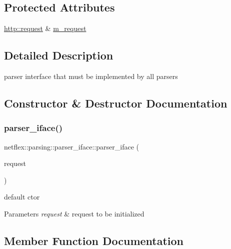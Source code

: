 \subsection*{Protected Attributes}
\begin{DoxyCompactItemize}
\item 
\hyperlink{classnetflex_1_1http_1_1request}{http\+::request} \& \hyperlink{classnetflex_1_1parsing_1_1parser__iface_a893c1abb768c2884318d7f35d315621b}{m\+\_\+request}
\end{DoxyCompactItemize}


\subsection{Detailed Description}
parser interface that must be implemented by all parsers 

\subsection{Constructor \& Destructor Documentation}
\mbox{\label{classnetflex_1_1parsing_1_1parser__iface_a3e1819d36fdab49c95da13c2411b1d21}} 
\subsubsection{\texorpdfstring{parser\+\_\+iface()}{parser\_iface()}}
{\footnotesize\ttfamily netflex\+::parsing\+::parser\+\_\+iface\+::parser\+\_\+iface (\begin{DoxyParamCaption}\item[{\hyperlink{classnetflex_1_1http_1_1request}{http\+::request} \&}]{request }\end{DoxyParamCaption})\hspace{0.3cm}{\ttfamily [explicit]}}

default ctor


\begin{DoxyParams}{Parameters}
{\em request} & request to be initialized \\
\hline
\end{DoxyParams}


\subsection{Member Function Documentation}
\mbox{\label{classnetflex_1_1parsing_1_1parser__iface_afebd1cc50d5958f712dfac0c023fd162}} 
